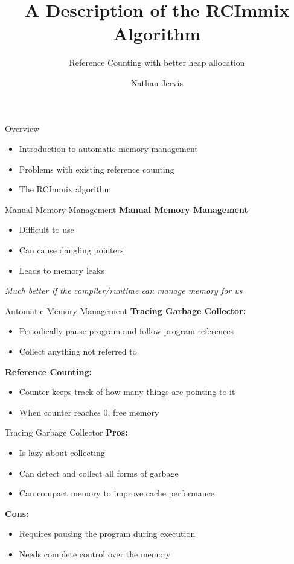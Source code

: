 \documentclass{beamer}
\title[RCImmix]{A Description of the RCImmix Algorithm}
\subtitle[RC]{Reference Counting with better heap allocation}
\author[N. Jervis]{Nathan Jervis}
\institute[McMaster]{
  Department of Computer Science\\
  McMaster University, Hamilton\\
  \texttt{jervisnd@mcmaster.ca}
}
\begin{document}
\begin{frame}[plain]
  \titlepage
\end{frame}

\begin{frame}{Overview}
	\begin{itemize}
		\item Introduction to automatic memory management
		\item Problems with existing reference counting
		\item The RCImmix algorithm
	\end{itemize}
\end{frame}

\begin{frame}{Manual Memory Management}
	\textbf{Manual Memory Management}
	\begin{itemize}
		\item Difficult to use
		\item Can cause dangling pointers
		\item Leads to memory leaks
	\end{itemize}
	\emph{Much better if the compiler/runtime can manage memory for us}
\end{frame}

\begin{frame}{Automatic Memory Management}
	\textbf{Tracing Garbage Collector:}
	\begin{itemize}
		\item Periodically pause program and follow program references
		\item Collect anything not referred to
	\end{itemize}
	\textbf{Reference Counting:}
	\begin{itemize}
		\item Counter keeps track of how many things are pointing to it
		\item When counter reaches 0, free memory
	\end{itemize}
\end{frame}

\begin{frame}{Tracing Garbage Collector}
	\textbf{Pros:}
	\begin{itemize}
		\item Is lazy about collecting
		\item Can detect and collect all forms of garbage
		\item Can compact memory to improve cache performance
	\end{itemize}
	\textbf{Cons:}
	\begin{itemize}
		\item Requires pausing the program during execution
		\item Needs complete control over the memory
	\end{itemize}
\end{frame}
\end{document}
